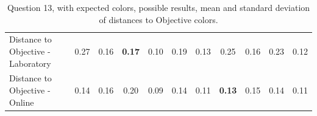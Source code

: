 \begin{table}[H]
{\begin{tabular}{lccccccccccccc}
    \multicolumn{4}{l}{Distance to Objective - Laboratory}                                                                                           & \multicolumn{1}{|c}{0.27}       & \multicolumn{1}{c|}{0.16}    & \multicolumn{1}{|c}{\textbf{0.17}}       & \multicolumn{1}{c|}{0.10}    & \multicolumn{1}{|c}{0.19}       & \multicolumn{1}{c|}{0.13}    & \multicolumn{1}{|c}{0.25}       & \multicolumn{1}{c|}{0.16}    & \multicolumn{1}{|c}{0.23}       & \multicolumn{1}{c|}{0.12}    \\
    \multicolumn{4}{l}{Distance to Objective - Online}                                                                                               & \multicolumn{1}{|c}{0.14}        & \multicolumn{1}{c|}{0.16}    & \multicolumn{1}{|c}{0.20}        & \multicolumn{1}{c|}{0.09}    & \multicolumn{1}{|c}{0.14}       & \multicolumn{1}{c|}{0.11}    & \multicolumn{1}{|c}{\textbf{0.13}}        & \multicolumn{1}{c|}{0.15}    & \multicolumn{1}{|c}{0.14}       & \multicolumn{1}{c|}{0.11}    \\ \hline
    \end{tabular}}
  \caption[Question 13, with expected Results.]{Question 13, with expected colors, possible results, mean and standard deviation of distances to Objective colors.}
  \label{table:lab_q13_expected}
\end{table}
%
%

